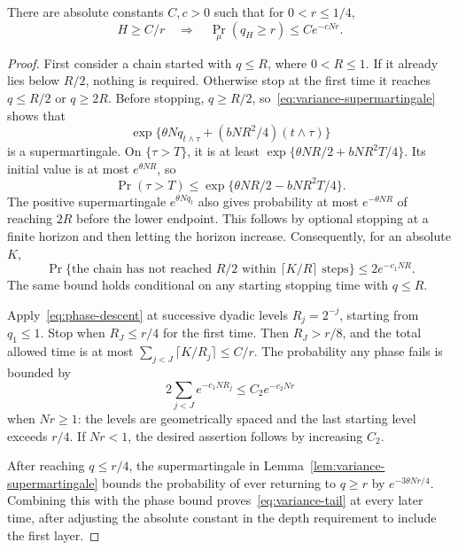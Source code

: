 \begin{lemma}
\label{lem:variance-tail}
There are absolute constants $C,c>0$ such that for $0<r\le1/4$,
\begin{equation}
 H\ge C/r\quad\Longrightarrow\quad
 \Pr_\mu(q_H\ge r)\le C e^{-cNr}.
 \label{eq:variance-tail}
\end{equation}
\end{lemma}
\begin{proof}
First consider a chain started with $q\le R$, where $0<R\le1$. If it already lies below $R/2$, nothing is required. Otherwise stop at the first time it reaches $q\le R/2$ or $q\ge2R$. Before stopping, $q\ge R/2$, so~\eqref{eq:variance-supermartingale} shows that
\[
 \exp\{\theta N q_{t\wedge\tau}+(bNR^2/4)(t\wedge\tau)\}
\]
is a supermartingale. On $\{\tau>T\}$, it is at least
$\exp\{\theta NR/2+bNR^2T/4\}$. Its initial value is at most $e^{\theta NR}$, so
\[
 \Pr(\tau>T)\le\exp\{\theta NR/2-bNR^2T/4\}.
\]
The positive supermartingale $e^{\theta Nq_t}$ also gives probability at most $e^{-\theta NR}$ of reaching $2R$ before the lower endpoint. This follows by optional stopping at a finite horizon and then letting the horizon increase. Consequently, for an absolute $K$,
\begin{equation}
 \Pr\{\text{the chain has not reached }R/2
              \text{ within }\lceil K/R\rceil\text{ steps}\}
 \le2e^{-c_1NR}.
 \label{eq:phase-descent}
\end{equation}
The same bound holds conditional on any starting stopping time with $q\le R$.

Apply~\eqref{eq:phase-descent} at successive dyadic levels
$R_j=2^{-j}$, starting from $q_1\le1$. Stop when $R_J\le r/4$ for the first time. Then $R_J>r/8$, and the total allowed time is at most
$\sum_{j<J}\lceil K/R_j\rceil\le C/r$.
The probability any phase fails is bounded by
\[
 2\sum_{j<J}e^{-c_1NR_j}\le C_2e^{-c_2Nr}
\]
when $Nr\ge1$: the levels are geometrically spaced and the last starting level exceeds $r/4$. If $Nr<1$, the desired assertion follows by increasing $C_2$.

After reaching $q\le r/4$, the supermartingale in Lemma~\ref{lem:variance-supermartingale} bounds the probability of ever returning to $q\ge r$ by $e^{-3\theta Nr/4}$. Combining this with the phase bound proves~\eqref{eq:variance-tail} at every later time, after adjusting the absolute constant in the depth requirement to include the first layer.
\end{proof}

